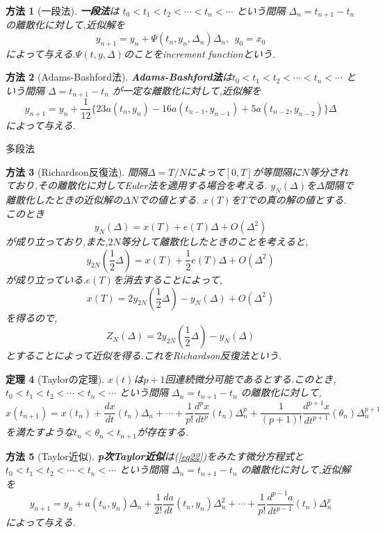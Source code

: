 \documentclass[dvipdfmx,cjk]{beamer}
\numberwithin{equation}{section}
\newtheorem{Thm}     {定理}[section]
\newtheorem{Method}[Thm]{方法}
\def\method{\begin{Method}}
\def\methodx{\end{Method}}
\def\thm{\begin{Thm}}
\def\thmx{\end{Thm}}
\def\eq{\begin{equation}}
\def\eqx{\end{equation}}
\begin{document}
\begin{frame}
\method[一段法]
{\bf 一段法}は $ t_0 < t_1 < t_2 < \cdots < t_n < \cdots $ という間隔 $\Delta_n = t_{n+1} - t_{n}$ の離散化に対して,近似解を
\eq
\label{eq7}
y_{n+1} = y_n + \Psi(t_n,y_n,\Delta_n) \Delta_n,\  \  y_0 = x_0
\eqx
によって与える.$\Psi(t,y,\Delta)$のことをincrement functionという.
\methodx
\end{frame}


\begin{frame}
\method[Adams-Bashford法]
{\bf Adams-Bashford法}は$ t_0 < t_1 < t_2 < \cdots < t_n < \cdots $ という間隔 $\Delta = t_{n+1} - t_{n}$ が一定な離散化に対して,近似解を
\eq
\label{eq8}
y_{n+1} = y_n + \frac{1}{12} \{ 23 a(t_n , y_n) - 16 a(t_{n-1},y_{n-1}) + 5 a(t_{n-2},y_{n-2}) \} \Delta
\eqx
によって与える.
\methodx
多段法
\end{frame}


\begin{frame}
\method[Richardson反復法]
間隔$\Delta = T/N$によって$[0,T]$が等間隔に$N$等分されており,その離散化に対してEuler法を適用する場合を考える.
$y_N(\Delta)$を$\Delta$間隔で離散化したときの近似解の$\Delta N$での値とする.
$x(T)$を$T$での真の解の値とする.このとき
\eq
y_N(\Delta) = x(T) + e(T) \Delta + O(\Delta^2)
\eqx
が成り立っており,また,$2N$等分して離散化したときのことを考えると,
\eq
y_{2N}(\frac{1}{2}\Delta) = x(T) + \frac{1}{2} e(T) \Delta + O(\Delta^2)
\eqx
が成り立っている.$e(T)$を消去することによって,
\eq
x(T) = 2y_{2N}(\frac{1}{2}\Delta) - y_N(\Delta) + O(\Delta^2)
\eqx
を得るので,
\eq
Z_N(\Delta) = 2y_{2N}(\frac{1}{2}\Delta) - y_N(\Delta)
\eqx
とすることによって近似を得る.これをRichardson反復法という.
\methodx
\end{frame}

\begin{frame}
\thm[Taylorの定理]
$x(t)$は$p+1$回連続微分可能であるとする.このとき,
$ t_0 < t_1 < t_2 < \cdots < t_n < \cdots $ という間隔 $\Delta_n = t_{n+1} - t_{n}$ の離散化に対して,
\eq
\label{eq21}
x(t_{n+1}) = x(t_n) + \frac{dx}{dt}(t_n)\Delta_n + \cdots + 
\frac{1}{p!}\frac{d^px}{dt^p}(t_n)\Delta^p_n + \frac{1}{(p+1)!}\frac{d^{p+1}x}{dt^{p+1}}(\theta_n)\Delta^{p+1}_n
\eqx
を満たすような$t_n < \theta_n < t_{n+1}$が存在する.
\thmx
\end{frame}


\begin{frame}
\method[Taylor近似]
{\bf p次Taylor近似}は(\ref{eq22})をみたす微分方程式と$ t_0 < t_1 < t_2 < \cdots < t_n < \cdots $ という間隔 $\Delta_n = t_{n+1} - t_{n}$ の離散化に対して,近似解を
\eq
\label{eq23}
y_{n+1} = y_n + a(t_n,y_n)\Delta_n + \frac{1}{2!}\frac{da}{dt}(t_n,y_n) \Delta_n^2 + \cdots + \frac{1}{p!}\frac{d^{p-1}a}{dt^{p-1}}(t_n)\Delta^p_n
\eqx
によって与える.
\methodx
\end{frame}
\end{document}
